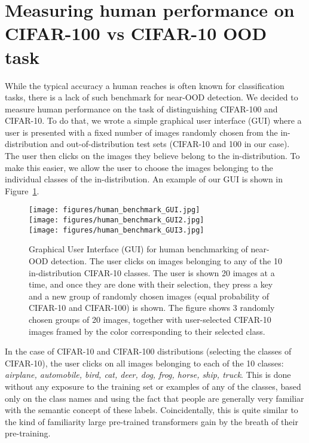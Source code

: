 \documentclass{article}
\begin{document}
\section{Measuring human performance on CIFAR-100 vs CIFAR-10 OOD task}\label{app:human}
While the typical accuracy a human reaches is often known for classification tasks, there is a lack of such benchmark for near-OOD detection. We decided to measure human performance on the task of distinguishing CIFAR-100 and CIFAR-10. To do that, we wrote a simple graphical user interface (GUI) where a user is presented with a fixed number of images randomly chosen from the in-distribution and out-of-distribution test sets (CIFAR-10 and 100 in our case). The user then clicks on the images they believe belong to the in-distribution. To make this easier, we allow the user to choose the images belonging to the individual classes of the in-distribution. An example of our GUI is shown in Figure~\ref{fig:human_bechmark}.
\begin{figure}[ht]
	\centering
\texttt{[image: figures/human\_benchmark\_GUI.jpg]}
\\	\vspace{1em}
\texttt{[image: figures/human\_benchmark\_GUI2.jpg]}
	\\	\vspace{1em}
	\texttt{[image: figures/human\_benchmark\_GUI3.jpg]}
	\caption{Graphical User Interface (GUI) for human benchmarking of near-OOD detection. The user clicks on images belonging to any of the 10 in-distribution CIFAR-10 classes. The user is shown 20 images at a time, and once they are done with their selection, they press a key and a new group of randomly chosen images (equal probability of CIFAR-10 and CIFAR-100) is shown. The figure shows 3 randomly chosen groups of 20 images, together with user-selected CIFAR-10 images framed by the color corresponding to their selected class.}
	\label{fig:human_bechmark}
\end{figure}


In the case of CIFAR-10 and CIFAR-100 distributions (selecting the classes of CIFAR-10), the user clicks on all images belonging to each of the 10 classes: \emph{airplane,	automobile,  
bird, cat, 	deer, dog, 	frog, horse, ship, truck}. This is done without any exposure to the training set or examples of any of the classes, based only on the class names and using the fact that people are generally very familiar with the semantic concept of these labels. Coincidentally, this is quite similar to the kind of familiarity large pre-trained transformers gain by the breath of their pre-training.
\end{document}
